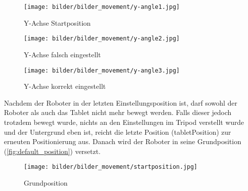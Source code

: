 \begin{figure}[!htbp]
\centering
    \texttt{[image: bilder/bilder\_movement/y-angle1.jpg]}
\caption{Y-Achse Startposition}
            \label{fig:y_axis_start}
\end{figure}
\begin{figure}[!htbp]
\centering
    \texttt{[image: bilder/bilder\_movement/y-angle2.jpg]}
    \caption{Y-Achse falsch eingestellt}
            \label{fig:y_axis_wrong}
\end{figure}
\begin{figure}[!htbp]
\centering
    \texttt{[image: bilder/bilder\_movement/y-angle3.jpg]}
    \caption{Y-Achse korrekt eingestellt}
            \label{fig:y_axis_correct}
\end{figure}
Nachdem der Roboter in der letzten Einstellungsposition ist, darf sowohl der Roboter als auch das Tablet nicht mehr bewegt werden. Falls dieser jedoch trotzdem bewegt wurde, nichts an den Einstellungen im Tripod verstellt wurde und der Untergrund eben ist, reicht die letzte Position (tabletPosition) zur erneuten Positionierung aus. 
Danach wird der Roboter in seine Grundposition (\vref{fig:default_position}) versetzt.
\begin{figure}[!htbp]
    \centering
    \texttt{[image: bilder/bilder\_movement/startposition.jpg]}
    \caption{Grundposition}
            \label{fig:default_position}
\end{figure}
